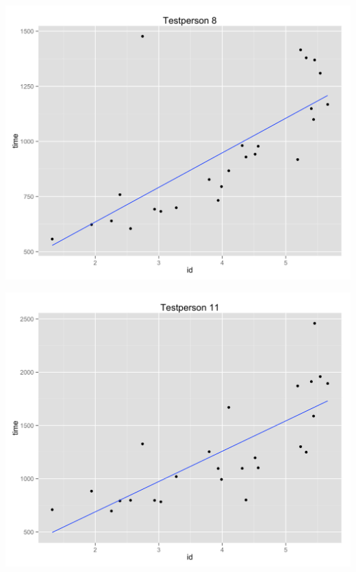 \begin{minipage}{\linewidth}
	\begin{minipage}[b]{.50\linewidth}
		\includegraphics[width=\textwidth]{images/plots/plot_model_test_1}
		\label{fig:testdeltager1}
	\end{minipage}
	\begin{minipage}[b]{0.50\linewidth}
		\includegraphics[width=\textwidth]{images/plots/plot_model_test_2}
		\label{fig:testdeltager3}
	\end{minipage}
\end{minipage}

